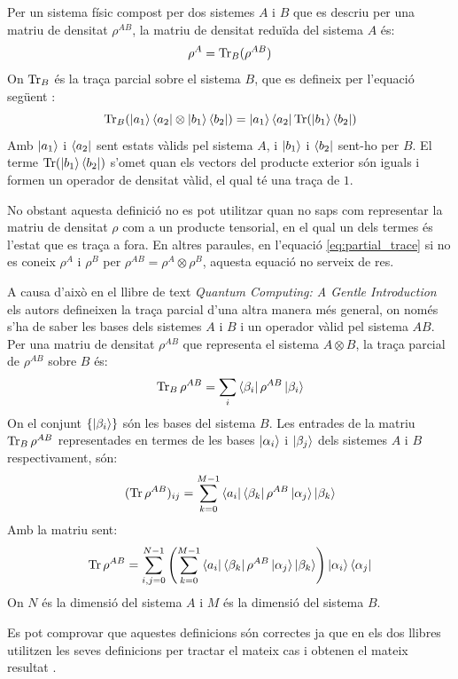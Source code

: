 Per un sistema físic compost per dos sistemes $A$ i $B$ que es descriu per una matriu de densitat $\rho^{AB}$, la matriu de densitat reduïda del sistema $A$ és:
\begin{equation}
\rho^A = \Tr_B(\rho^{AB})
	\label{eq:partial_trace}
\end{equation}
On $\Tr_B$ és la traça parcial sobre el sistema $B$, que es defineix per l'equació següent \cite{QCandQI:partial_trace}: 
\begin{equation*}
	\Tr_B(\ket{a_1}\bra{a_2}\otimes\ket{b_1}\bra{b_2}) = \ket{a_1}\bra{a_2}\Tr(\ket{b_1}\bra{b_2})
\end{equation*}
Amb $\ket{a_1}$ i $\bra{a_2}$ sent estats vàlids pel sistema $A$, i $\ket{b_1}$ i $\bra{b_2}$ sent-ho per $B$. El terme $\Tr(\ket{b_1}\bra{b_2})$ s'omet quan els vectors del producte exterior són iguals i formen un operador de densitat vàlid, el qual té una traça de $1$.

No obstant aquesta definició no es pot utilitzar quan no saps com representar la matriu de densitat $\rho$ com a un producte tensorial, en el qual un dels termes és l'estat que es traça a fora. En altres paraules, en l'equació \ref{eq:partial_trace} si no es coneix $\rho^A$ i $\rho^B$ per $\rho^{AB} = \rho^A\otimes\rho^B$, aquesta equació no serveix de res.

A causa d'això en el llibre de text \textit{Quantum Computing: A Gentle Introduction} \cite{QC_intro} els autors defineixen la traça parcial d'una altra manera més general, on només s'ha de saber les bases dels sistemes $A$ i $B$ i un operador vàlid pel sistema $AB$. Per una matriu de densitat $\rho^{AB}$ que representa el sistema $A\otimes B$, la traça parcial de $\rho^{AB}$ sobre $B$ és:
$$
\Tr_B \rho^{AB} = \sum_i \bra{\beta_i}\rho^{AB}\ket{\beta_i}
$$
On el conjunt $\{ \ket{\beta_i} \}$ són les bases del sistema $B$. Les entrades de la matriu $\Tr_B \rho^{AB}$ representades en termes de les bases ${\ket{\alpha_i}}$ i ${\ket{\beta_j}}$ dels sistemes $A$ i $B$ respectivament, són:
$$
(\Tr\rho^{AB})_{ij} = \sum_{k=0}^{M-1} \bra{a_i}\bra{\beta_k}\rho^{AB}\ket{\alpha_j}\ket{\beta_k}
$$
Amb la matriu sent:
$$
\Tr\rho^{AB} = 
\sum_{i,j=0}^{N-1}\left(\sum_{k=0}^{M-1} \bra{a_i}\bra{\beta_k}\rho^{AB}\ket{\alpha_j}\ket{\beta_k}\right) \ket{\alpha_i}\bra{\alpha_j}
$$
On $N$ és la dimensió del sistema $A$ i $M$ és la dimensió del sistema $B$. 

Es pot comprovar que aquestes definicions són correctes ja que en els dos llibres utilitzen les seves definicions per tractar el mateix cas i obtenen el mateix resultat \cite{QCandQI:example_partial, QC_intro:example_partial}.

